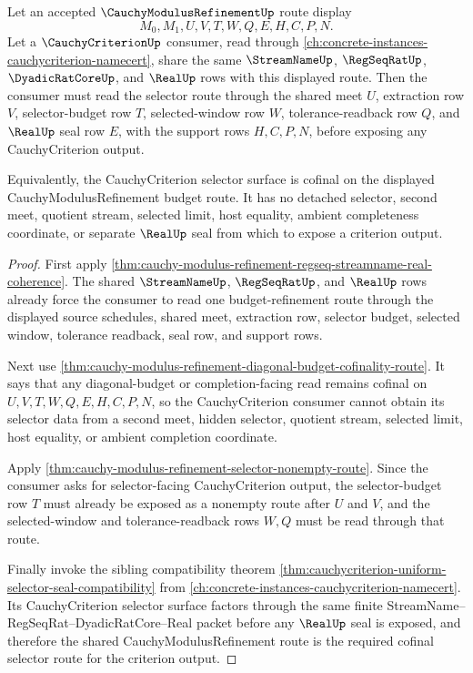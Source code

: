 \begin{theorem}
\label{thm:cauchy-modulus-refinement-cauchycriterion-selector-cofinality}
Let an accepted $\CauchyModulusRefinementUp$ route display
$$
M_0,M_1,U,V,T,W,Q,E,H,C,P,N.
$$
Let a $\CauchyCriterionUp$ consumer, read through \autoref{ch:concrete-instances-cauchycriterion-namecert}, share the same $\StreamNameUp$, $\RegSeqRatUp$, $\DyadicRatCoreUp$, and $\RealUp$ rows with this displayed route. Then the consumer must read the selector route through the shared meet $U$, extraction row $V$, selector-budget row $T$, selected-window row $W$, tolerance-readback row $Q$, and $\RealUp$ seal row $E$, with the support rows $H,C,P,N$, before exposing any CauchyCriterion output.

Equivalently, the CauchyCriterion selector surface is cofinal on the displayed CauchyModulusRefinement budget route. It has no detached selector, second meet, quotient stream, selected limit, host equality, ambient completeness coordinate, or separate $\RealUp$ seal from which to expose a criterion output.
\end{theorem}
\begin{proof}
First apply \autoref{thm:cauchy-modulus-refinement-regseq-streamname-real-coherence}. The shared $\StreamNameUp$, $\RegSeqRatUp$, and $\RealUp$ rows already force the consumer to read one budget-refinement route through the displayed source schedules, shared meet, extraction row, selector budget, selected window, tolerance readback, seal row, and support rows.

Next use \autoref{thm:cauchy-modulus-refinement-diagonal-budget-cofinality-route}. It says that any diagonal-budget or completion-facing read remains cofinal on $U,V,T,W,Q,E,H,C,P,N$, so the CauchyCriterion consumer cannot obtain its selector data from a second meet, hidden selector, quotient stream, selected limit, host equality, or ambient completion coordinate.

Apply \autoref{thm:cauchy-modulus-refinement-selector-nonempty-route}. Since the consumer asks for selector-facing CauchyCriterion output, the selector-budget row $T$ must already be exposed as a nonempty route after $U$ and $V$, and the selected-window and tolerance-readback rows $W,Q$ must be read through that route.

Finally invoke the sibling compatibility theorem \autoref{thm:cauchycriterion-uniform-selector-seal-compatibility} from \autoref{ch:concrete-instances-cauchycriterion-namecert}. Its CauchyCriterion selector surface factors through the same finite StreamName--RegSeqRat--DyadicRatCore--Real packet before any $\RealUp$ seal is exposed, and therefore the shared CauchyModulusRefinement route is the required cofinal selector route for the criterion output.
\end{proof}

